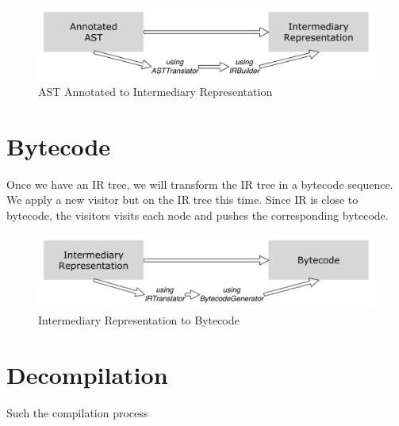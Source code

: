 \documentclass[a4paper,10pt,twoside]{book}
\begin{document}
\begin{figure}[ht]\centering
	\includegraphics[width=\linewidth]{AnnotatedASTToIR}
	\caption{AST Annotated to Intermediary Representation  }
\end{figure}




\section{Bytecode}
Once we have an IR tree, we will transform the IR tree in a bytecode sequence. We apply a new visitor but on the IR tree this time. Since IR is close to bytecode, the visitors visits each node and pushes the corresponding bytecode.

\begin{figure}[ht]\centering
	\includegraphics[width=\linewidth]{IRToBytecode}
	\caption{Intermediary Representation to Bytecode }
\end{figure}


\section{Decompilation}
Such the compilation process

\ifx\wholebook\relax\else
   
   
\end{document}
